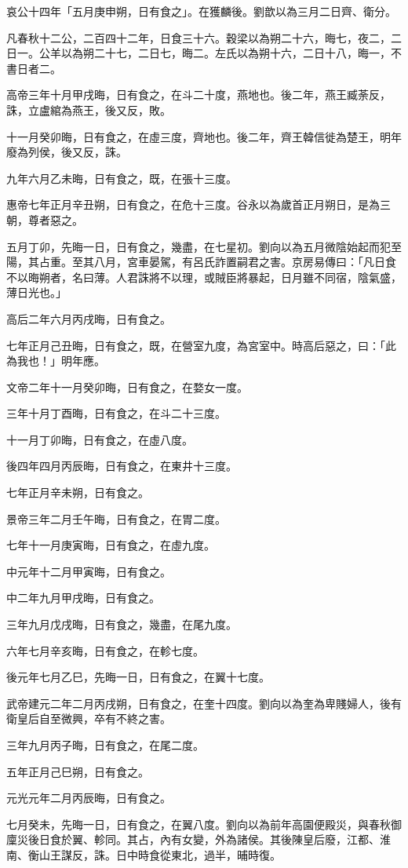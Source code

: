 \begin{pinyinscope}
哀公十四年「五月庚申朔，日有食之」。在獲麟後。劉歆以為三月二日齊、衛分。

凡春秋十二公，二百四十二年，日食三十六。穀梁以為朔二十六，晦七，夜二，二日一。公羊以為朔二十七，二日七，晦二。左氏以為朔十六，二日十八，晦一，不書日者二。

高帝三年十月甲戌晦，日有食之，在斗二十度，燕地也。後二年，燕王臧荼反，誅，立盧綰為燕王，後又反，敗。

十一月癸卯晦，日有食之，在虛三度，齊地也。後二年，齊王韓信徙為楚王，明年廢為列侯，後又反，誅。

九年六月乙未晦，日有食之，既，在張十三度。

惠帝七年正月辛丑朔，日有食之，在危十三度。谷永以為歲首正月朔日，是為三朝，尊者惡之。

五月丁卯，先晦一日，日有食之，幾盡，在七星初。劉向以為五月微陰始起而犯至陽，其占重。至其八月，宮車晏駕，有呂氏詐置嗣君之害。京房易傳曰：「凡日食不以晦朔者，名曰薄。人君誅將不以理，或賊臣將暴起，日月雖不同宿，陰氣盛，薄日光也。」

高后二年六月丙戌晦，日有食之。

七年正月己丑晦，日有食之，既，在營室九度，為宮室中。時高后惡之，曰：「此為我也！」明年應。

文帝二年十一月癸卯晦，日有食之，在婺女一度。

三年十月丁酉晦，日有食之，在斗二十三度。

十一月丁卯晦，日有食之，在虛八度。

後四年四月丙辰晦，日有食之，在東井十三度。

七年正月辛未朔，日有食之。

景帝三年二月壬午晦，日有食之，在胃二度。

七年十一月庚寅晦，日有食之，在虛九度。

中元年十二月甲寅晦，日有食之。

中二年九月甲戌晦，日有食之。

三年九月戊戌晦，日有食之，幾盡，在尾九度。

六年七月辛亥晦，日有食之，在軫七度。

後元年七月乙巳，先晦一日，日有食之，在翼十七度。

武帝建元二年二月丙戌朔，日有食之，在奎十四度。劉向以為奎為卑賤婦人，後有衛皇后自至微興，卒有不終之害。

三年九月丙子晦，日有食之，在尾二度。

五年正月己巳朔，日有食之。

元光元年二月丙辰晦，日有食之。

七月癸未，先晦一日，日有食之，在翼八度。劉向以為前年高園便殿災，與春秋御廩災後日食於翼、軫同。其占，內有女變，外為諸侯。其後陳皇后廢，江都、淮南、衡山王謀反，誅。日中時食從東北，過半，晡時復。


\end{pinyinscope}
